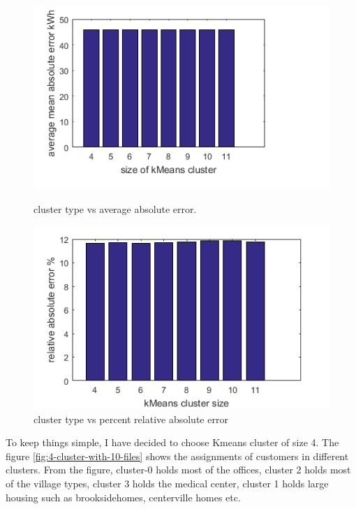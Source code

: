 \begin{figure}
\centering
\begin{minipage}{.5\textwidth}
  \centering
  \includegraphics[width=\linewidth]{diff-szied-kmeansAbsErroPercent.png}
  \caption{cluster type vs average absolute error.}
  \label{fig:cluster-type-vs-error}
\end{minipage}%
\begin{minipage}{.5\textwidth}
  \centering
  \includegraphics[width=\linewidth]{diff-szied-kmeansRelativeAbsErroPercent.png}
  \caption{cluster type vs percent relative absolute error}
\end{minipage}
\end{figure}

To keep things simple, I have decided to choose Kmeans cluster of size 4. The figure \ref{fig:4-cluster-with-10-files} shows the assignments of customers in different clusters. From the figure, cluster-0 holds most of the offices, cluster 2 holds most of the village types, cluster 3 holds the medical center, cluster 1 holds large housing such as brooksidehomes, centerville homes etc.

